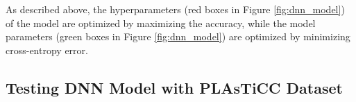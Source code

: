 \documentclass[useamsfonts]{pasj01}
\begin{document}
As described above, the hyperparameters (red boxes in Figure \ref{fig:dnn_model}) of the model are optimized by maximizing the accuracy, while 
the model parameters (green boxes in Figure \ref{fig:dnn_model}) are optimized by minimizing cross-entropy error.



\subsection{Testing DNN Model with PLAsTiCC Dataset} 
\label{sec:p}
\end{document}
